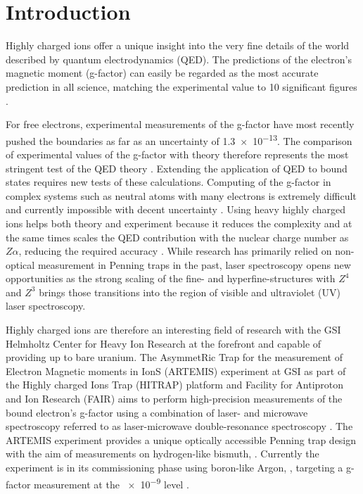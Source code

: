 \chapter{Introduction}
Highly charged ions offer a unique insight into the very fine details of the world described by quantum electrodynamics (QED). The predictions of the electron’s magnetic moment (g-factor) can easily be regarded as the most accurate prediction in all science, matching the experimental value to \num{10} significant figures \cite{gfactor_theory}.

For free electrons, experimental measurements of the g-factor have most recently pushed the boundaries as far as an uncertainty of \num{1.3e-13}. The comparison of experimental values of the g-factor with theory therefore represents the most stringent test of the QED theory \cite{bi82+_qed}. Extending the application of QED to bound states requires new tests of these calculations. Computing of the g-factor in complex systems such as neutral atoms with many electrons is extremely difficult and currently impossible with decent uncertainty \cite{gfactor_theory_codegen}. Using heavy highly charged ions helps both theory and experiment because it reduces the complexity and at the same times scales the QED contribution with the nuclear charge number as $Z\alpha$, reducing the required accuracy \cite{gfactor_ions_scaling}. While research has primarily relied on non-optical measurement in Penning traps in the past, laser spectroscopy opens new opportunities \cite{penning_trap_laser_spectroscopy} as the strong scaling of the fine- and hyperfine-structures with $Z^4$ and $Z^3$ brings those transitions into the region of visible and ultraviolet (UV) laser spectroscopy.

Highly charged ions are therefore an interesting field of research with the GSI Helmholtz Center for Heavy Ion Research at the forefront and capable of providing up to bare uranium. The AsymmetRic Trap for the measurement of Electron Magnetic moments in IonS (ARTEMIS) experiment at GSI as part of the Highly charged Ions Trap (HITRAP) platform and Facility for Antiproton and Ion Research (FAIR) aims to perform high-precision measurements of the bound electron's g-factor using a combination of laser- and microwave spectroscopy referred to as laser-microwave double-resonance spectroscopy \cite{laser_microwave_double_resonance_spectroscopy}. The ARTEMIS experiment provides a unique optically accessible Penning trap design \cite{penning_trap_transparent,penning_trap_half_open} with the aim of measurements on hydrogen-like bismuth, . Currently the experiment is in its commissioning phase using boron-like Argon, , targeting a g-factor measurement at the \num{e-9} level \cite{BoundElectronGFactorMeasurement}.

